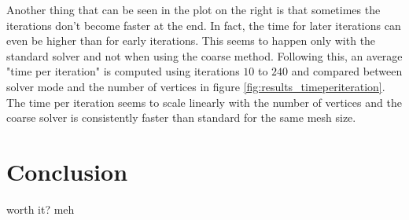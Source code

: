 \documentclass[a4paper,twoside,12pt,nochapterprefix]{scrbook}
\begin{document}
Another thing that can be seen in the plot on the right is that sometimes the iterations don't become faster at the end. In fact, the time for later iterations can even be higher than for early iterations. This seems to happen only with the standard solver and not when using the coarse method.\newline
Following this, an average "time per iteration" is computed using iterations $10$ to $240$ and compared between solver mode and the number of vertices in figure \ref{fig:results_timeperiteration}. The time per iteration seems to scale linearly with the number of vertices and the coarse solver is consistently faster than standard for the same mesh size.\newline %

\chapter{Conclusion}\label{sec:conclusion}
worth it? meh
\cite{dadada}%
\cite{athing}



{}

%
\end{document}
